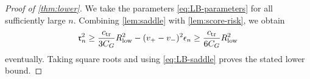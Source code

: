 \begin{proof}[Proof of \cref{thm:lower}]
We take the parameters \eqref{eq:LB-parameters} for all sufficiently
large $n$. Combining \cref{lem:saddle} with \cref{lem:score-risk}, we
obtain
\[
 \mathfrak r_n^2\ge\frac{c_{\rm tr}}{3C_G}R_{\rm low}^2
 -(v_+-v_-)^2\epsilon_n\ge\frac{c_{\rm tr}}{6C_G}R_{\rm low}^2
\]
eventually. Taking square roots and using \eqref{eq:LB-saddle}
proves the stated lower bound.
\end{proof}
